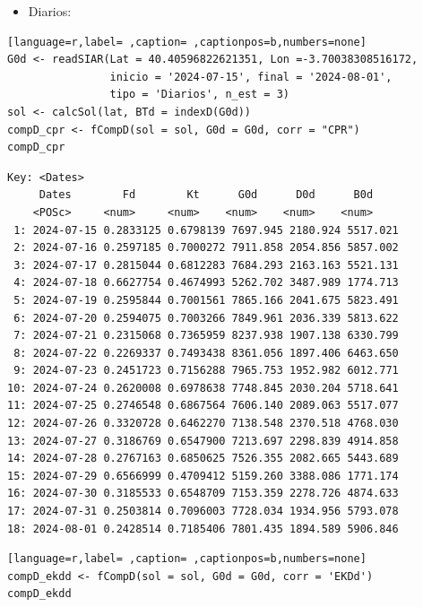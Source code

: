 \begin{itemize}
\begin{itemize}
\item Diarios:
\end{itemize}
\begin{lstlisting}[language=r,label= ,caption= ,captionpos=b,numbers=none]
G0d <- readSIAR(Lat = 40.40596822621351, Lon =-3.70038308516172,
                inicio = '2024-07-15', final = '2024-08-01',
                tipo = 'Diarios', n_est = 3)
sol <- calcSol(lat, BTd = indexD(G0d))
compD_cpr <- fCompD(sol = sol, G0d = G0d, corr = "CPR")
compD_cpr
\end{lstlisting}

\begin{verbatim}
Key: <Dates>
	 Dates        Fd        Kt      G0d      D0d      B0d
	<POSc>     <num>     <num>    <num>    <num>    <num>
 1: 2024-07-15 0.2833125 0.6798139 7697.945 2180.924 5517.021
 2: 2024-07-16 0.2597185 0.7000272 7911.858 2054.856 5857.002
 3: 2024-07-17 0.2815044 0.6812283 7684.293 2163.163 5521.131
 4: 2024-07-18 0.6627754 0.4674993 5262.702 3487.989 1774.713
 5: 2024-07-19 0.2595844 0.7001561 7865.166 2041.675 5823.491
 6: 2024-07-20 0.2594075 0.7003266 7849.961 2036.339 5813.622
 7: 2024-07-21 0.2315068 0.7365959 8237.938 1907.138 6330.799
 8: 2024-07-22 0.2269337 0.7493438 8361.056 1897.406 6463.650
 9: 2024-07-23 0.2451723 0.7156288 7965.753 1952.982 6012.771
10: 2024-07-24 0.2620008 0.6978638 7748.845 2030.204 5718.641
11: 2024-07-25 0.2746548 0.6867564 7606.140 2089.063 5517.077
12: 2024-07-26 0.3320728 0.6462270 7138.548 2370.518 4768.030
13: 2024-07-27 0.3186769 0.6547900 7213.697 2298.839 4914.858
14: 2024-07-28 0.2767163 0.6850625 7526.355 2082.665 5443.689
15: 2024-07-29 0.6566999 0.4709412 5159.260 3388.086 1771.174
16: 2024-07-30 0.3185533 0.6548709 7153.359 2278.726 4874.633
17: 2024-07-31 0.2503814 0.7096003 7728.034 1934.956 5793.078
18: 2024-08-01 0.2428514 0.7185406 7801.435 1894.589 5906.846
\end{verbatim}

\begin{lstlisting}[language=r,label= ,caption= ,captionpos=b,numbers=none]
compD_ekdd <- fCompD(sol = sol, G0d = G0d, corr = 'EKDd')
compD_ekdd
\end{lstlisting}


\end{itemize}
